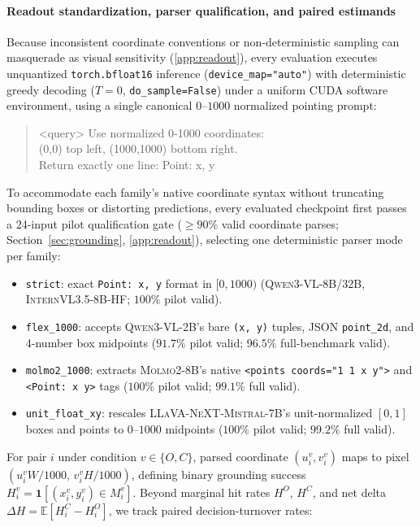 \paragraph{Readout standardization, parser qualification, and paired estimands}
Because inconsistent coordinate conventions or non-deterministic sampling can masquerade as visual sensitivity (\ref{app:readout}), every evaluation executes unquantized \texttt{torch.bfloat16} inference (\texttt{device\_map="auto"}) with deterministic greedy decoding ($T{=}0$, \texttt{do\_sample=False}) under a uniform CUDA software environment, using a single canonical $0\text{--}1000$ normalized pointing prompt:
\begin{quote}\footnotesize\ttfamily
<query> Use normalized 0-1000 coordinates:\\
(0,0) top left, (1000,1000) bottom right.\\
Return exactly one line: Point: x, y
\end{quote}
To accommodate each family's native coordinate syntax without truncating bounding boxes or distorting predictions, every evaluated checkpoint first passes a 24-input pilot qualification gate ($\ge 90\%$ valid coordinate parses; Section~\ref{sec:grounding}, \ref{app:readout}), selecting one deterministic parser mode per family:
\begin{itemize}
    \item \texttt{strict}: exact \texttt{Point:\ x, y} format in $[0, 1000)$ (\textsc{Qwen3-VL-8B/32B}, \textsc{InternVL3.5-8B-HF}; $100\%$ pilot valid).
    \item \texttt{flex\_1000}: accepts \textsc{Qwen3-VL-2B}'s bare \texttt{(x, y)} tuples, JSON \texttt{point\_2d}, and 4-number box midpoints ($91.7\%$ pilot valid; $96.5\%$ full-benchmark valid).
    \item \texttt{molmo2\_1000}: extracts \textsc{Molmo2-8B}'s native \texttt{<points coords="1 1 x y">} and \texttt{<Point:\ x y>} tags ($100\%$ pilot valid; $99.1\%$ full valid).
    \item \texttt{unit\_float\_xy}: rescales \textsc{LLaVA-NeXT-Mistral-7B}'s unit-normalized $[0, 1]$ boxes and points to $0\text{--}1000$ midpoints ($100\%$ pilot valid; $99.2\%$ full valid).
\end{itemize}
For pair $i$ under condition $v \in \{O, C\}$, parsed coordinate $(u_i^v, v_i^v)$ maps to pixel $(u_i^v W / 1000,\, v_i^v H / 1000)$, defining binary grounding success $H_i^v = \mathbf{1}[(x_i^v, y_i^v) \in M_i^v]$. Beyond marginal hit rates $H^O$, $H^C$, and net delta $\Delta H = \mathbb{E}[H_i^C - H_i^O]$, we track paired decision-turnover rates:
